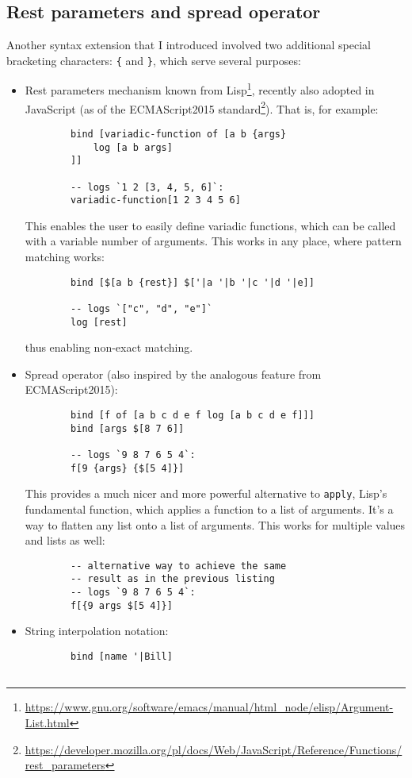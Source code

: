 \subsection{Rest parameters and spread operator}\label{sub:rest}
Another syntax extension that I introduced involved two additional special bracketing characters: \texttt{\{} and \texttt{\}}, which serve several purposes:
\begin{itemize}
    \item Rest parameters mechanism known from Lisp\footnote{\url{https://www.gnu.org/software/emacs/manual/html_node/elisp/Argument-List.html}}, recently also adopted in JavaScript (as of the ECMAScript2015 standard\footnote{\url{https://developer.mozilla.org/pl/docs/Web/JavaScript/Reference/Functions/rest_parameters}}). That is, for example:
    \begin{lstlisting}
        bind [variadic-function of [a b {args}
            log [a b args]
        ]]
        
        -- logs `1 2 [3, 4, 5, 6]`:
        variadic-function[1 2 3 4 5 6]
    \end{lstlisting}
    This enables the user to easily define variadic functions, which can be called with a variable number of arguments. 
    This works in any place, where pattern matching works:
    \begin{lstlisting}
        bind [$[a b {rest}] $['|a '|b '|c '|d '|e]]
        
        -- logs `["c", "d", "e"]`
        log [rest]
    \end{lstlisting}
    
    thus enabling non-exact matching.
    
    \item Spread operator (also inspired by the analogous feature from ECMAScript2015):
    \begin{lstlisting}
        bind [f of [a b c d e f log [a b c d e f]]]
        bind [args $[8 7 6]]
        
        -- logs `9 8 7 6 5 4`:
        f[9 {args} {$[5 4]}]
    \end{lstlisting}
    This provides a much nicer and more powerful alternative to \texttt{apply}, Lisp's fundamental function, which applies a function to a list of arguments. It's a way to flatten any list onto a list of arguments. This works for multiple values and lists as well:
    \begin{lstlisting}
        -- alternative way to achieve the same
        -- result as in the previous listing
        -- logs `9 8 7 6 5 4`:
        f[{9 args $[5 4]}]
    \end{lstlisting}
    \item String interpolation notation:
    \begin{lstlisting}
        bind [name '|Bill]
        

\end{lstlisting}
\end{itemize}
